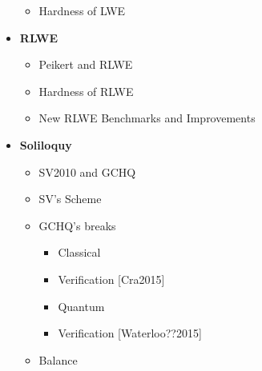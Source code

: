 \documentclass{report}
\begin{document}
\begin{itemize}
\begin{itemize}
					\item Hardness of LWE
				\end{itemize}
			\item \textbf{RLWE}
				\begin{itemize}
					\item Peikert and RLWE
					\item Hardness of RLWE
					\item New RLWE Benchmarks and Improvements
				\end{itemize}
			\item \textbf{Soliloquy}
				\begin{itemize}
					\item SV2010 and GCHQ
					\item SV's Scheme
					\item GCHQ's breaks
						\begin{itemize}
							\item Classical
							\item Verification [Cra2015]
							\item Quantum
							\item Verification [Waterloo??2015]
						\end{itemize}
					\item Balance
				\end{itemize}
	\end{itemize}
	
\end{document}
